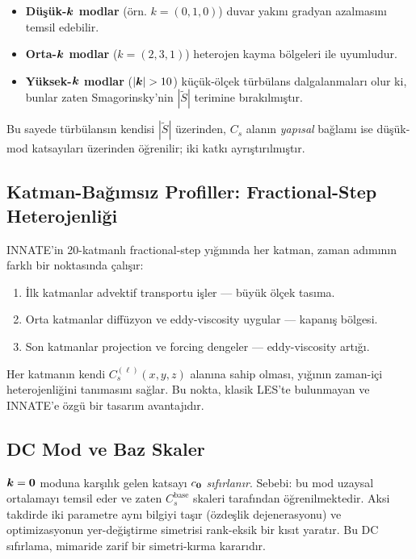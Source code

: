\begin{itemize}
  \item \textbf{Düşük-$\bm{k}$ modlar} (örn. $k=(0,1,0)$) duvar yakını
        gradyan azalmasını temsil edebilir.
  \item \textbf{Orta-$\bm{k}$ modlar} ($k=(2,3,1)$) heterojen kayma
        bölgeleri ile uyumludur.
  \item \textbf{Yüksek-$\bm{k}$ modlar} ($|\vect{k}|>10$) küçük-ölçek
        türbülans dalgalanmaları olur ki, bunlar zaten Smagorinsky'nin
        $|\widetilde{S}|$ terimine bırakılmıştır.
\end{itemize}

Bu sayede türbülansın kendisi $|\widetilde{S}|$ üzerinden, $C_s$ alanın
\emph{yapısal} bağlamı ise düşük-mod katsayıları üzerinden öğrenilir;
iki katkı ayrıştırılmıştır.

\subsection{Katman-Bağımsız Profiller: Fractional-Step Heterojenliği}

INNATE'in 20-katmanlı fractional-step yığınında her katman, zaman
adımının farklı bir noktasında çalışır:

\begin{enumerate}
  \item İlk katmanlar advektif transportu işler — büyük ölçek tasıma.
  \item Orta katmanlar diffüzyon ve eddy-viscosity uygular — kapanış
        bölgesi.
  \item Son katmanlar projection ve forcing dengeler — eddy-viscosity
        artığı.
\end{enumerate}

Her katmanın kendi $C_s^{(\ell)}(x,y,z)$ alanına sahip olması, yığının
zaman-içi heterojenliğini tanımasını sağlar. Bu nokta, klasik LES'te
bulunmayan ve INNATE'e özgü bir tasarım avantajıdır.

\subsection{DC Mod ve Baz Skaler}

$\bm{k}=\bm{0}$ moduna karşılık gelen katsayı $c_{\bm{0}}$
\emph{sıfırlanır}. Sebebi: bu mod uzaysal ortalamayı temsil eder ve
zaten $C_s^{\mathrm{base}}$ skaleri tarafından öğrenilmektedir.
Aksi takdirde iki parametre aynı bilgiyi taşır (özdeşlik dejenerasyonu)
ve optimizasyonun yer-değiştirme simetrisi rank-eksik bir kısıt
yaratır. Bu DC sıfırlama, mimaride zarif bir simetri-kırma kararıdır.

